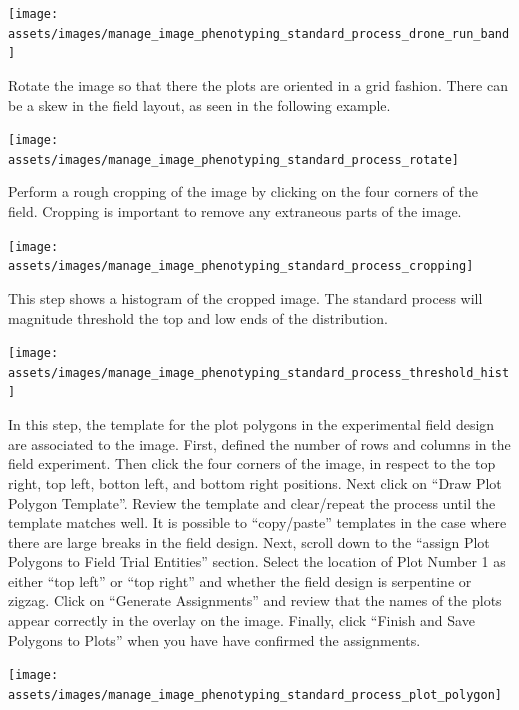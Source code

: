 \documentclass[
  12pt,
]{book}
\begin{document}
\begin{center}\texttt{[image: assets/images/manage\_image\_phenotyping\_standard\_process\_drone\_run\_band]} \end{center}

Rotate the image so that there the plots are oriented in a grid fashion. There can be a skew in the field layout, as seen in the following example.

\begin{center}\texttt{[image: assets/images/manage\_image\_phenotyping\_standard\_process\_rotate]} \end{center}

Perform a rough cropping of the image by clicking on the four corners of the field. Cropping is important to remove any extraneous parts of the image.

\begin{center}\texttt{[image: assets/images/manage\_image\_phenotyping\_standard\_process\_cropping]} \end{center}

This step shows a histogram of the cropped image. The standard process will magnitude threshold the top and low ends of the distribution.

\begin{center}\texttt{[image: assets/images/manage\_image\_phenotyping\_standard\_process\_threshold\_hist]} \end{center}

In this step, the template for the plot polygons in the experimental field design are associated to the image. First, defined the number of rows and columns in the field experiment. Then click the four corners of the image, in respect to the top right, top left, botton left, and bottom right positions. Next click on ``Draw Plot Polygon Template''. Review the template and clear/repeat the process until the template matches well. It is possible to ``copy/paste'' templates in the case where there are large breaks in the field design. Next, scroll down to the ``assign Plot Polygons to Field Trial Entities'' section. Select the location of Plot Number 1 as either ``top left'' or ``top right'' and whether the field design is serpentine or zigzag. Click on ``Generate Assignments'' and review that the names of the plots appear correctly in the overlay on the image. Finally, click ``Finish and Save Polygons to Plots'' when you have have confirmed the assignments.

\begin{center}\texttt{[image: assets/images/manage\_image\_phenotyping\_standard\_process\_plot\_polygon]} \end{center}
\end{document}
